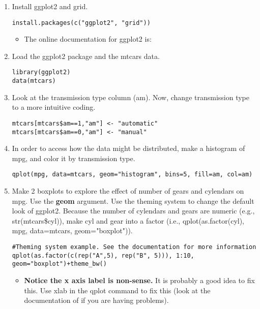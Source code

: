 \documentclass[11pt]{article}
\begin{document}
\begin{enumerate}
\item Install ggplot2 and grid.

\lstset{language=R,label=install ggplot2 and grid,caption= ,captionpos=b,numbers=none}
\begin{lstlisting}
install.packages(c("ggplot2", "grid"))
\end{lstlisting}

\begin{itemize}
\item The online documentation for ggplot2 is: \href{http://docs.ggplot2.org/current}{\color{blue}{ggplot2}}
\end{itemize}

\item Load the ggplot2 package and the mtcars data.

\lstset{language=R,label= ,caption= ,captionpos=b,numbers=none}
\begin{lstlisting}
library(ggplot2)
data(mtcars)
\end{lstlisting}

\item Look at the transmission type column (am). Now, change transmission type to a more intuitive coding.

\lstset{language=R,label= ,caption= ,captionpos=b,numbers=none}
\begin{lstlisting}
mtcars[mtcars$am==1,"am"] <- "automatic" 
mtcars[mtcars$am==0,"am"] <- "manual"
\end{lstlisting}

\item In order to access how the data might be distributed, make a histogram of mpg, and color it by transmission type.

\lstset{language=R,label= ,caption= ,captionpos=b,numbers=none}
\begin{lstlisting}
qplot(mpg, data=mtcars, geom="histogram", bins=5, fill=am, col=am)
\end{lstlisting}

\item Make 2 boxplots to explore the effect of number of gears and cylendars on mpg. Use the \textbf{geom} argument. Use the theming system to change the default look of ggplot2. Because the number of cylendars and gears are numeric (e.g., str(mtcars\$cyl)), make cyl and gear into a factor (i.e., qplot(as.factor(cyl), mpg, data=mtcars, geom="boxplot")).

\lstset{language=R,label= ,caption= ,captionpos=b,numbers=none}
\begin{lstlisting}
#Theming system example. See the documentation for more information
qplot(as.factor(c(rep("A",5), rep("B", 5))), 1:10, geom="boxplot")+theme_bw()
\end{lstlisting}
\begin{itemize}
\item \textbf{Notice the x axis label is non-sense.} It is probably a good idea to fix this. Use xlab in the qplot command to fix this (look at the documentation of \href{http://docs.ggplot2.org/current/qplot.html}{\color{blue}{qplot}}  if you are having problems).
\end{itemize}


\end{enumerate}
\end{document}
